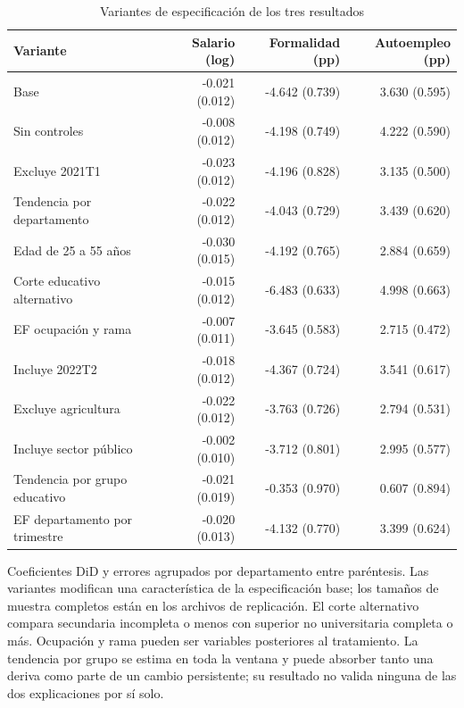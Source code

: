 \begin{table}[!htbp]\centering
\caption{Variantes de especificación de los tres resultados}\label{tab:short_specs}
\begin{threeparttable}\small
\setlength{\tabcolsep}{4pt}
\begin{tabular}{lrrr}
\toprule
Variante & Salario (log) & Formalidad (pp) & Autoempleo (pp) \\
\midrule
Base & -0.021 (0.012) & -4.642 (0.739) & 3.630 (0.595) \\
Sin controles & -0.008 (0.012) & -4.198 (0.749) & 4.222 (0.590) \\
Excluye 2021T1 & -0.023 (0.012) & -4.196 (0.828) & 3.135 (0.500) \\
Tendencia por departamento & -0.022 (0.012) & -4.043 (0.729) & 3.439 (0.620) \\
Edad de 25 a 55 años & -0.030 (0.015) & -4.192 (0.765) & 2.884 (0.659) \\
Corte educativo alternativo & -0.015 (0.012) & -6.483 (0.633) & 4.998 (0.663) \\
EF ocupación y rama & -0.007 (0.011) & -3.645 (0.583) & 2.715 (0.472) \\
Incluye 2022T2 & -0.018 (0.012) & -4.367 (0.724) & 3.541 (0.617) \\
Excluye agricultura & -0.022 (0.012) & -3.763 (0.726) & 2.794 (0.531) \\
Incluye sector público & -0.002 (0.010) & -3.712 (0.801) & 2.995 (0.577) \\
Tendencia por grupo educativo & -0.021 (0.019) & -0.353 (0.970) & 0.607 (0.894) \\
EF departamento por trimestre & -0.020 (0.013) & -4.132 (0.770) & 3.399 (0.624) \\
\bottomrule
\end{tabular}
\begin{tablenotes}\footnotesize
\item Coeficientes DiD y errores agrupados por departamento entre paréntesis. Las variantes modifican una característica de la especificación base; los tamaños de muestra completos están en los archivos de replicación. El corte alternativo compara secundaria incompleta o menos con superior no universitaria completa o más. Ocupación y rama pueden ser variables posteriores al tratamiento. La tendencia por grupo se estima en toda la ventana y puede absorber tanto una deriva como parte de un cambio persistente; su resultado no valida ninguna de las dos explicaciones por sí solo.
\end{tablenotes}
\end{threeparttable}\end{table}
